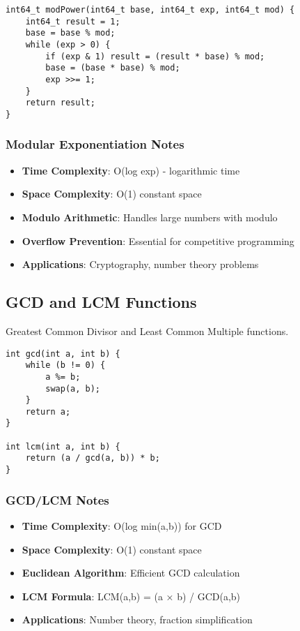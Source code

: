 \documentclass[11pt,a4paper]{article}
\begin{document}
\begin{lstlisting}[caption={Modular Exponentiation}]
int64_t modPower(int64_t base, int64_t exp, int64_t mod) {
    int64_t result = 1;
    base = base % mod;
    while (exp > 0) {
        if (exp & 1) result = (result * base) % mod;
        base = (base * base) % mod;
        exp >>= 1;
    }
    return result;
}
\end{lstlisting}

\subsubsection*{Modular Exponentiation Notes}
\begin{itemize}
\item \textbf{Time Complexity}: O(log exp) - logarithmic time
\item \textbf{Space Complexity}: O(1) constant space
\item \textbf{Modulo Arithmetic}: Handles large numbers with modulo
\item \textbf{Overflow Prevention}: Essential for competitive programming
\item \textbf{Applications}: Cryptography, number theory problems
\end{itemize}

\newpage
\subsection{GCD and LCM Functions}
Greatest Common Divisor and Least Common Multiple functions.

\begin{lstlisting}[caption={GCD and LCM Functions}]
int gcd(int a, int b) {
    while (b != 0) {
        a %= b;
        swap(a, b);
    }
    return a;
}

int lcm(int a, int b) {
    return (a / gcd(a, b)) * b;
}
\end{lstlisting}

\subsubsection*{GCD/LCM Notes}
\begin{itemize}
\item \textbf{Time Complexity}: O(log min(a,b)) for GCD
\item \textbf{Space Complexity}: O(1) constant space
\item \textbf{Euclidean Algorithm}: Efficient GCD calculation
\item \textbf{LCM Formula}: LCM(a,b) = (a × b) / GCD(a,b)
\item \textbf{Applications}: Number theory, fraction simplification
\end{itemize}
\end{document}
